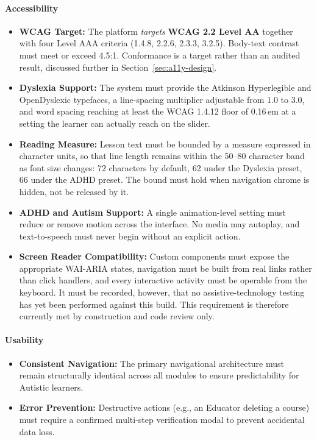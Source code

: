 \documentclass[12pt, oneside]{article} %
\begin{document}
\paragraph{Accessibility}
\begin{itemize}
    \item \textbf{WCAG Target:} The platform \emph{targets} \textbf{WCAG 2.2 Level AA} \cite{wcag22} together with four Level AAA criteria (1.4.8, 2.2.6, 2.3.3, 3.2.5). Body-text contrast must meet or exceed 4.5:1. Conformance is a target rather than an audited result, discussed further in Section~\ref{sec:a11y-design}.
    \item \textbf{Dyslexia Support:} The system must provide the Atkinson Hyperlegible \cite{atkinson2021atkinson} and OpenDyslexic \cite{opendyslexic} typefaces, a line-spacing multiplier adjustable from 1.0 to 3.0, and word spacing reaching at least the WCAG 1.4.12 floor of 0.16\,em at a setting the learner can actually reach on the slider.
    \item \textbf{Reading Measure:} Lesson text must be bounded by a measure expressed in character units, so that line length remains within the 50--80 character band as font size changes: 72 characters by default, 62 under the Dyslexia preset, 66 under the ADHD preset. The bound must hold when navigation chrome is hidden, not be released by it.
    \item \textbf{ADHD and Autism Support:} A single animation-level setting must reduce or remove motion across the interface. No media may autoplay, and text-to-speech must never begin without an explicit action.
    \item \textbf{Screen Reader Compatibility:} Custom components must expose the appropriate WAI-ARIA states, navigation must be built from real links rather than click handlers, and every interactive activity must be operable from the keyboard. It must be recorded, however, that no assistive-technology testing has yet been performed against this build. This requirement is therefore currently met by construction and code review only.
\end{itemize}

\paragraph{Usability}
\begin{itemize}
    \item \textbf{Consistent Navigation:} The primary navigational architecture must remain structurally identical across all modules to ensure predictability for Autistic learners.
    \item \textbf{Error Prevention:} Destructive actions (e.g., an Educator deleting a course) must require a confirmed multi-step verification modal to prevent accidental data loss.
\end{itemize}
\end{document}
